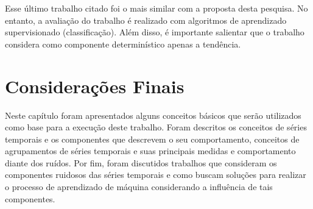 Esse último trabalho citado foi o mais similar com a proposta desta pesquisa. No entanto, a avaliação do trabalho é realizado com algoritmos de aprendizado supervisionado (classificação). Além disso, é importante salientar que o trabalho considera como componente determinístico apenas a tendência. 
 
\section{Considerações Finais}

Neste capítulo foram apresentados alguns conceitos básicos que serão utilizados como base para a execução deste trabalho. Foram descritos os conceitos de séries temporais e os componentes que descrevem o seu comportamento, conceitos de agrupamentos de séries temporais e suas principais medidas e comportamento diante dos ruídos. Por fim, foram discutidos trabalhos que consideram os componentes ruidosos das séries temporais e como buscam soluções para realizar o processo de aprendizado de máquina considerando a influência de tais componentes.
